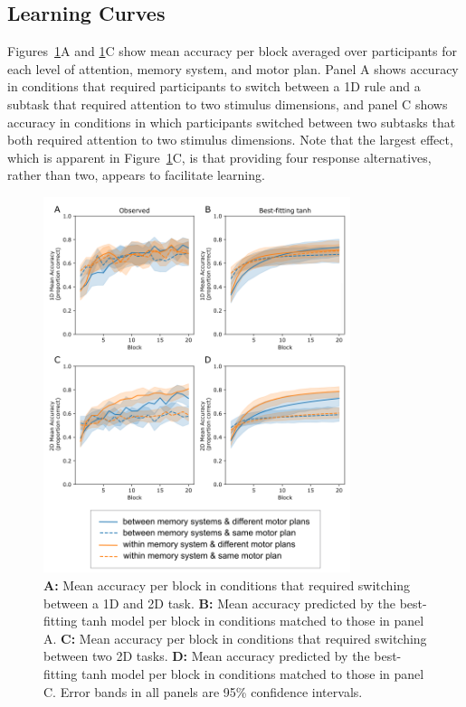 \documentclass[doc, floatsintext]{apa7}
\begin{document}
\subsection{Learning Curves}
Figures~\ref{fig_3}A and \ref{fig_3}C show mean accuracy per
block averaged over participants for each level of
attention, memory system, and motor plan. Panel A shows
accuracy in conditions that required participants to switch
between a 1D rule and a subtask that required attention to
two stimulus dimensions, and panel C shows accuracy in
conditions in which participants switched between two
subtasks that both required attention to two stimulus
dimensions. Note that the largest effect, which is apparent
in Figure~\ref{fig_3}C, is that providing four response
alternatives, rather than two, appears to facilitate
learning.

\begin{figure}[h!]
    \centering
    \includegraphics[width=0.8\textwidth]{../figures/fig3.png}
    \caption{
        \textbf{A:} Mean accuracy per block in conditions that
        required switching between a 1D and 2D task.
        \textbf{B:} Mean accuracy predicted by the best-fitting
        tanh model per block in conditions matched to those in
        panel A.
        \textbf{C:} Mean accuracy per block in conditions that
        required switching between two 2D tasks.
        \textbf{D:} Mean accuracy predicted by the best-fitting
        tanh model per block in conditions matched to those in
        panel C.  Error bands in all panels are 95\% confidence
        intervals.
    }
    \label{fig_3}
\end{figure}
\end{document}
